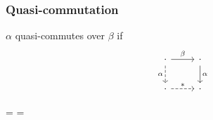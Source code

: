 \documentclass[12pt,aspectratio=169]{beamer}
\begin{document}
\begin{frame}[fragile]
    \frametitle{Quasi-commutation}
    \begin{definition}
        $\alpha$ \alert{quasi-commutes} over $\beta$ if
        \[
        \begin{tikzcd}
            \cdot & \cdot \\
            \cdot & \cdot
            \arrow["\beta", from=1-1, to=1-2]
            \arrow["\alpha", from=1-2, to=2-2]
            \arrow["\alpha"', dashed, from=1-1, to=2-1]
            \arrow["{*}", dashed, from=2-1, to=2-2]
        \end{tikzcd}
        \]
    \end{definition}

    \begin{example}
    \end{example}
\end{frame}

\newlength{\mytotalwidth}
\mytotalwidth=\dimexpr\linewidth-5mm
\newlength{\mycolumnwidth}
\mycolumnwidth=\dimexpr\mytotalwidth-5mm
\end{document}
